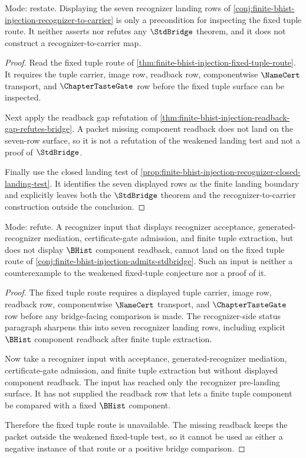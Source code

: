 \begin{theorem}
\label{thm:finite-bhist-injection-stdbridge-nonclaim-boundary}
Mode: restate. Displaying the seven recognizer landing rows of \autoref{conj:finite-bhist-injection-recognizer-to-carrier} is only a precondition for inspecting the fixed tuple route. It neither asserts nor refutes any $\StdBridge$ theorem, and it does not construct a recognizer-to-carrier map.
\end{theorem}
\begin{proof}
Read the fixed tuple route of \autoref{thm:finite-bhist-injection-fixed-tuple-route}. It requires the tuple carrier, image row, readback row, componentwise $\NameCert$ transport, and $\ChapterTasteGate$ row before the fixed tuple surface can be inspected.

Next apply the readback gap refutation of \autoref{thm:finite-bhist-injection-readback-gap-refutes-bridge}. A packet missing component readback does not land on the seven-row surface, so it is not a refutation of the weakened landing test and not a proof of $\StdBridge$.

Finally use the closed landing test of \autoref{prop:finite-bhist-injection-recognizer-closed-landing-test}. It identifies the seven displayed rows as the finite landing boundary and explicitly leaves both the $\StdBridge$ theorem and the recognizer-to-carrier construction outside the conclusion.
\end{proof}

\begin{theorem}
\label{thm:finite-bhist-injection-recognizer-to-carrier-sharp-obstruction}
Mode: refute. A recognizer input that displays recognizer acceptance, generated-recognizer mediation, certificate-gate admission, and finite tuple extraction, but does not display $\BHist$ component readback, cannot land on the fixed tuple route of \autoref{conj:finite-bhist-injection-admits-stdbridge}. Such an input is neither a counterexample to the weakened fixed-tuple conjecture nor a proof of it.
\end{theorem}
\begin{proof}
The fixed tuple route requires a displayed tuple carrier, image row, readback row, componentwise $\NameCert$ transport, and $\ChapterTasteGate$ row before any bridge-facing comparison is made. The recognizer-side status paragraph sharpens this into seven recognizer landing rows, including explicit $\BHist$ component readback after finite tuple extraction.

Now take a recognizer input with acceptance, generated-recognizer mediation, certificate-gate admission, and finite tuple extraction but without displayed component readback. The input has reached only the recognizer pre-landing surface. It has not supplied the readback row that lets a finite tuple component be compared with a fixed $\BHist$ component.

Therefore the fixed tuple route is unavailable. The missing readback keeps the packet outside the weakened fixed-tuple test, so it cannot be used as either a negative instance of that route or a positive bridge comparison.
\end{proof}

